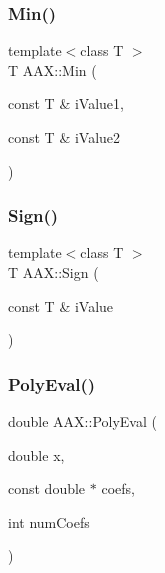 \subsubsection{\texorpdfstring{Min()}{Min()}}
{\footnotesize\ttfamily template$<$class T $>$ \\
T A\+A\+X\+::\+Min (\begin{DoxyParamCaption}\item[{const T \&}]{i\+Value1,  }\item[{const T \&}]{i\+Value2 }\end{DoxyParamCaption})\hspace{0.3cm}{\ttfamily [inline]}}

\mbox{\label{a00852_ab6a3e1aef81cd84dec2eee9a27755bb0}} 
\subsubsection{\texorpdfstring{Sign()}{Sign()}}
{\footnotesize\ttfamily template$<$class T $>$ \\
T A\+A\+X\+::\+Sign (\begin{DoxyParamCaption}\item[{const T \&}]{i\+Value }\end{DoxyParamCaption})\hspace{0.3cm}{\ttfamily [inline]}}

\mbox{\label{a00852_aa0094a6a87ca0c48f58b48ce5eea636e}} 
\subsubsection{\texorpdfstring{PolyEval()}{PolyEval()}}
{\footnotesize\ttfamily double A\+A\+X\+::\+Poly\+Eval (\begin{DoxyParamCaption}\item[{double}]{x,  }\item[{const double $\ast$}]{coefs,  }\item[{int}]{num\+Coefs }\end{DoxyParamCaption})\hspace{0.3cm}{\ttfamily [inline]}}

\mbox{\label{a00852_aad5df8c4502619ca12136a2f7b8d8a06}} 
